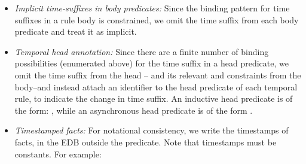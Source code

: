 \begin{itemize}
%
%
\item {\em Implicit time-suffixes in body predicates:} Since the binding
pattern for time suffixes in a rule body is constrained, we omit the time
suffix from each body predicate and treat it as implicit.

\item {\em Temporal head annotation:} Since there are a finite number of
binding possibilities (enumerated above) for the time suffix in a head
predicate, we omit the time suffix from the head -- and its relevant
 and  constraints from the body--and instead
attach an identifier to the head predicate of each temporal rule, to indicate
the change in time suffix.  An inductive head predicate  is of the
form: , while an asynchronous head predicate
 is of the form .

\item {\em Timestamped facts:} For notational consistency, we write the
timestamps of facts, in the EDB outside the
predicate.  Note that timestamps must be constants.  For example:


%
%
%
%
%
\end{itemize}


